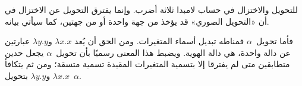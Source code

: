 \documentclass[../../../include/open-logic-section]{subfiles}
\begin{document}

للتحويل والاختزال في حساب لامبدا ثلاثة أضرب. وإنما يفترق التحويل عن
الاختزال في أن «التحويل الصوري» قد يؤخذ من جهة واحدة أو من جهتين، كما
سيأتي بيانه.

فأما تحويل~$\alpha$ فمناطه تبديل أسماء المتغيرات. ومن الحق أن يُعد
$\lambda x. x$ و$\lambda y.y$ عبارتين عن دالة واحدة، هي دالة الهوية.
ويضبط هذا المعنى رسميًا بأن تحويل~$\alpha$ يجعل حدين متطابقين متى لم
يفترقا إلا بتسمية المتغيرات المقيدة تسمية متسقة؛ ومن ثم يتكافأ
$\lambda x.x$ و$\lambda y.y$ بتحويل~$\alpha$.
\end{document}
